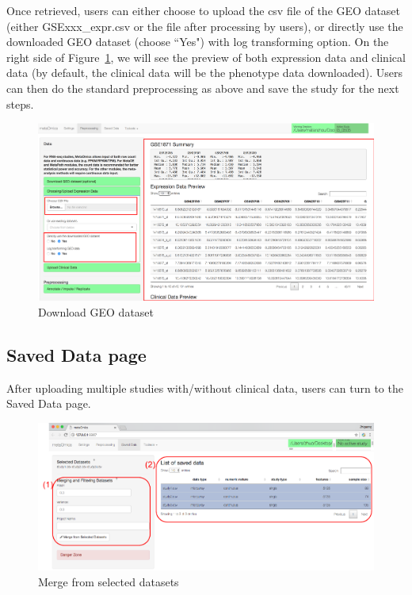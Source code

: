 Once retrieved, users can either choose to upload the csv file of the GEO dataset (either GSExxx\_expr.csv or the file after processing by users), or directly use the downloaded GEO dataset (choose ``Yes") with log transforming option. On the right side of Figure~\ref{fig:GEO_2}, we will see the preview of both expression data and clinical data (by default, the clinical data will be the phenotype data downloaded). Users can then do the standard preprocessing as above and save the study for the next steps.

\begin{figure}[H]
\begin{center}
\includegraphics[scale=0.5]{./figure/preprocessing/geo_2}
\caption{Download GEO dataset}
\label{fig:GEO_2}
\end{center}
\end{figure}

\subsection{Saved Data page}
\label{sec:saved}

After uploading multiple studies with/without clinical data,
users can turn to the Saved Data page.

\begin{figure}[H]
\begin{center}
\includegraphics[scale=1]{./figure/preprocessing/GUImerge.pdf}
\caption{Merge from selected datasets}
\label{fig:GUImerge}
\end{center}
\end{figure}


